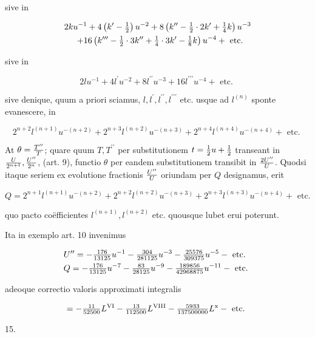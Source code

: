 \documentclass[twoside,12pt, showframe]{memoir}
\let\oldfrac\frac
\def\frac#1#2{\mathchoice{\tfrac{#1}{#2}}{\oldfrac{#1}{#2}}{\genfrac{}{}{}{2}{#1}{#2\mathstrut}}{\genfrac{}{}{}{3}{#1}{#2\mathstrut}}}
\begin{document}
sive in

\[
\begin{gathered}
2 k u^{-1}+4\left(k^{\prime}-\frac{1}{2}\right) u^{-2}+8\left(k^{\prime \prime}-\frac{1}{2} \cdot 2 k^{\prime}+\frac{1}{4} k\right) u^{-3} \\
\quad+16\left(k^{\prime \prime \prime}-\frac{1}{2} \cdot 3 k^{\prime \prime}+\frac{1}{4} \cdot 3 k^{\prime}-\frac{1}{8} k\right) u^{-4}+\text { etc. }
\end{gathered}
\]

sive in

\[
2 l u^{-1}+4 l^{\prime} u^{-2}+8 l^{\prime \prime} u^{-3}+16 l^{\prime \prime \prime} u^{-4}+\text { etc. }
\]

sive denique, quum a priori sciamus, \(l, l^{\prime}, l^{\prime \prime}, l^{\prime \prime \prime}\) etc. usque ad \(l^{(n)}\) sponte evanescere, in

\[
2^{n+2} l^{(n+1)} u^{-(n+2)}+2^{n+3} l^{(n+2)} u^{-(n+3)}+2^{n+4} l^{(n+4)} u^{-(n+4)}+\text { etc. }
\]

At \(\theta=\frac{T^{\prime \prime}}{T}\); quare quum \(T, T^{\prime \prime}\) per substitutionem \(t=\frac{1}{2} u+\frac{1}{2}\) transeant in \(\frac{U}{2^{n+1}}, \frac{U^{\prime \prime}}{2^{n}}\), (art. 9), functio \(\theta\) per eandem substitutionem transibit in \(\frac{2 U^{\prime \prime}}{U}\). Quodsi itaque seriem ex evolutione fractionis \(\frac{U^{\prime \prime}}{U}\) oriundam per \(Q\) designamus, erit

\[
Q=2^{n+1} l^{(n+1)} u^{-(n+2)}+2^{n+2} l^{(n+2)} u^{-(n+3)}+2^{n+3} l^{(n+3)} u^{-(n+4)}+\text { etc. }
\]

quo pacto coëfficientes \(l^{(n+1)}, l^{(n+2)}\) etc. quousque lubet erui poterunt.

Ita in exemplo art. 10 invenimus

\[
\begin{aligned}
& U^{\prime \prime}=-\frac{176}{13125} u^{-1}-\frac{304}{281125} u^{-3}-\frac{25576}{309375} u^{-5}-\text { etc. } \\
& Q=-\frac{176}{13125} u^{-7}-\frac{83}{28125} u^{-9}-\frac{189856}{42968875} u^{-11}-\text { etc. }
\end{aligned}
\]

adeoque correctio valoris approximati integralis

\[
=-\frac{11}{52500} L^{\mathrm{VI}}-\frac{13}{112500} L^{\mathrm{VIII}}-\frac{5933}{137500000} L^{\mathrm{x}}-\text { etc. }
\]

15.
\end{document}
